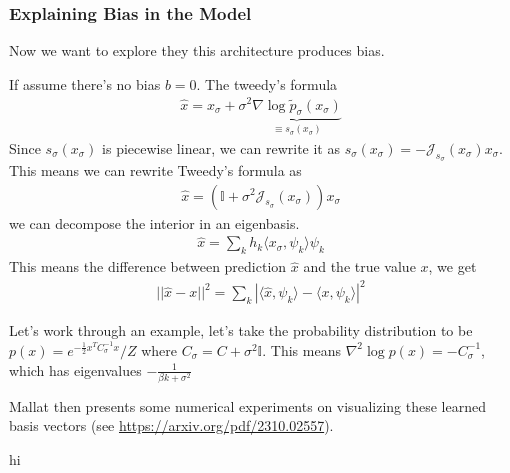 \subsubsection{Explaining Bias in the Model}
Now we want to explore they this architecture produces bias.

If assume there's no bias $b=0$. The tweedy's formula 
\begin{align}
	\hat x = x_\sigma + \sigma^2 \underbrace{\nabla \log \tilde p_\sigma(x_\sigma)}_{\equiv s_\sigma (x_\sigma)}
\end{align}
Since $s_\sigma (x_\sigma)$ is piecewise linear, we can rewrite it as $s_\sigma (x_\sigma) = - \mathcal J_{s_\sigma}(x_\sigma) x_\sigma$. This means we can rewrite Tweedy's formula as
\begin{align}
	\hat x = \left ( \mathbb I + \sigma^2 \mathcal J_{s_\sigma}(x_\sigma) \right)x_\sigma
\end{align}
we can decompose the interior in an eigenbasis.
\begin{align}
	\hat x = \sum_k h_k \langle x_\sigma, \psi_k\rangle \psi_k
\end{align}
This means the difference between prediction $\hat x$ and the true value $x$, we get
\begin{align}
	||\hat x - x||^2 = \sum_{k} | \langle \hat x , \psi_k \rangle - \langle x, \psi_k \rangle | ^2
\end{align}
\begin{sidework}
	Let's work through an example, let's take the probability distribution to be $p(x) = e^{- \frac{1}{2}x^T C_\sigma^{-1}x} / Z$ where $C_\sigma = C + \sigma^2 \mathbb I$. This means $\nabla^2 \log p(x) = -C_\sigma^{-1}$, which has eigenvalues $-\frac{1}{\beta k + \sigma^2}$
\end{sidework}
Mallat then presents some numerical experiments on visualizing these learned basis vectors (see \url{https://arxiv.org/pdf/2310.02557}).



























\newpage
hi


